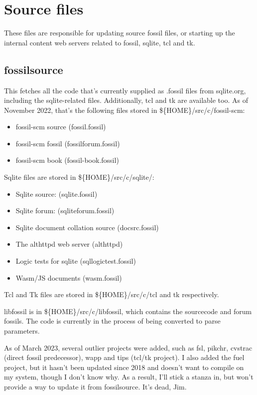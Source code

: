 \documentclass[11pt]{article}
\begin{document}
\setcounter{tocdepth}{2}
\tableofcontents

\newpage

\section*{Source files}
\label{sec:orgc2ed861}

These files are responsible for updating source fossil files, or starting up the internal
content web servers related to fossil, sqlite, tcl and tk.

\subsection*{fossilsource}
\label{sec:org655a90e}

This fetches all the code that's currently supplied as .fossil files from sqlite.org, including
the sqlite-related files. Additionally, tcl and tk are available too.
As of November 2022, that's the following files stored in \$\{HOME\}/src/c/fossil-scm:
\begin{itemize}
\item fossil-scm source (fossil.fossil)
\item fossil-scm fossil (fossilforum.fossil)
\item fossil-scm book (fossil-book.fossil)
\end{itemize}

Sqlite files are stored in \$\{HOME\}/src/c/sqlite/:
\begin{itemize}
\item Sqlite source: (sqlite.fossil)
\item Sqlite forum: (sqliteforum.fossil)
\item Sqlite document collation source (docsrc.fossil)
\item The althttpd web server (althttpd)
\item Logic tests for sqlite (sqllogictest.fossil)
\item Wasm/JS documents (wasm.fossil)
\end{itemize}

Tcl and Tk files are stored in \$\{HOME\}/src/c/tcl and tk respectively.

libfossil is in \$\{HOME\}/src/c/libfossil, which contains the sourcecode and forum fossils.
The code is currently in the process of being converted to parse parameters.

As of March 2023, several outlier projects were added, such as fsl, pikchr, cvstrac (direct fossil
predecessor), wapp and tips (tcl/tk project). I also added the fuel project, but it hasn't been
updated since 2018 and doesn't want to compile on my system, though I don't know why. As a
result, I'll stick a stanza in, but won't provide a way to update it from fossilsource. It's dead, Jim.
\end{document}
